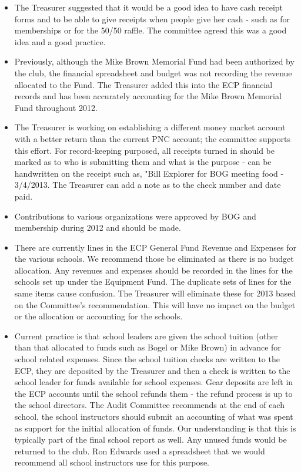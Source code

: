\documentclass[10pt,a4paper]{article}
\begin{document}
\begin{multicols}{2}
\begin{itemize}
\item The Treasurer suggested that it would be a good idea to have cash receipt forms and to be able to give receipts when people give her cash - such as for memberships or for the 50/50 raffle.  The committee agreed this was a good idea and a good practice.

\item Previously, although the Mike Brown Memorial Fund had been authorized by the club, the financial spreadsheet and budget was not recording the revenue allocated to the Fund.  The Treasurer added this into the ECP financial records and has been accurately accounting for the Mike Brown Memorial Fund throughout 2012.  

\item The Treasurer is working on establishing a different money market account with a better return than the current PNC account; the committee supports this effort.
For record-keeping purposed, all receipts turned in should be marked as to who is submitting them and what is the purpose - can be handwritten on the receipt such as, "Bill Explorer for BOG meeting food - 3/4/2013.  The Treasurer can add a note as to the check number and date paid.


\item Contributions to various organizations were approved by BOG and membership during 2012 and should be made.


\item There are currently lines in the ECP General Fund Revenue and Expenses for the various schools.  We recommend those be eliminated as there is no budget allocation.  Any revenues and expenses should be recorded in the lines for the schools set up under the Equipment Fund.  The duplicate sets of lines for the same items cause confusion.  The Treasurer will eliminate these for 2013 based on the Committee's recommendation.  This will have no impact on the budget or the allocation or accounting for the schools.

\item Current practice is that school leaders are given the school tuition (other than that allocated to funds such as Bogel or Mike Brown) in advance for school related expenses.  Since the school tuition checks are written to the ECP, they are deposited by the Treasurer and then a check is written to the school leader for funds available for school expenses.  Gear deposits are left in the ECP accounts until the school refunds them - the refund process is up to the school directors.  The Audit Committee recommends at the end of each school, the school instructors should submit an accounting of what was spent as support for the initial allocation of funds.  Our understanding is that this is typically part of the final school report as well.  Any unused funds would be returned to the club.  Ron Edwards used a spreadsheet that we would recommend all school instructors use for this purpose.   



\end{itemize}
\end{multicols}
\end{document}
